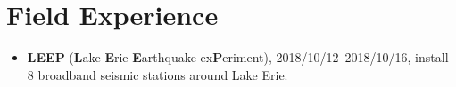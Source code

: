 \section*{Field Experience}

\begin{itemize}
\item \textbf{LEEP} (\textbf{L}ake \textbf{E}rie \textbf{E}arthquake ex\textbf{P}eriment),
      2018/10/12--2018/10/16, install 8 broadband seismic stations around Lake Erie.
\end{itemize}
